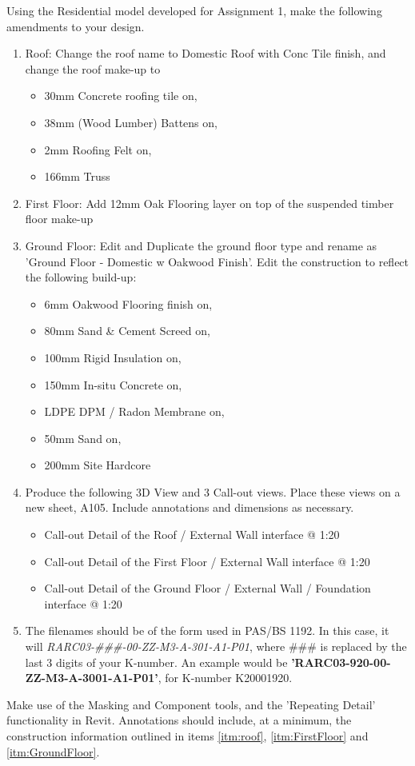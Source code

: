 Using the Residential model developed for Assignment 1, make the following amendments to your design.
\begin{enumerate}
	\item\label{itm:roof} Roof: Change the roof name to Domestic Roof with Conc Tile finish, and change the roof make-up to 
	\begin{itemize}
		\item 30mm Concrete roofing tile on,
		\item 38mm (Wood Lumber) Battens on,
		\item 2mm Roofing Felt on,
		\item 166mm Truss
	\end{itemize}
	\item\label{itm:FirstFloor} First Floor: Add 12mm Oak Flooring layer on top of the suspended timber floor make-up
	\item\label{itm:GroundFloor} Ground Floor: Edit and Duplicate the ground floor type and rename as 'Ground Floor - Domestic w Oakwood Finish'.  Edit the construction to reflect the following build-up:
	\begin{itemize}
		\item 6mm Oakwood Flooring finish on,
		\item 80mm Sand \& Cement Screed on,
		\item 100mm Rigid Insulation on,
		\item 150mm In-situ Concrete on,
		\item LDPE DPM / Radon Membrane on,
		\item 50mm Sand on,
		\item 200mm Site Hardcore
	\end{itemize}
	\item Produce the following 3D View and 3 Call-out views. Place these views on a new sheet, A105.  Include annotations and dimensions as necessary.
	\begin{itemize}
		\item Call-out Detail of the Roof / External Wall interface @ 1:20
		\item Call-out Detail of the First Floor / External Wall interface @ 1:20
		\item Call-out Detail of the Ground Floor / External Wall / Foundation interface @ 1:20
	\end{itemize}
	\item The filenames should be of the form used in PAS/BS 1192.  In this case, it will \textit{RARC03-\#\#\#-00-ZZ-M3-A-301-A1-P01}, where \#\#\# is replaced by the last 3 digits of your K-number. An example would be \textbf{'RARC03-920-00-ZZ-M3-A-3001-A1-P01'}, for K-number K20001920.
\end{enumerate}
Make use of the Masking and Component tools, and the 'Repeating Detail' functionality in Revit.  Annotations should include, at a minimum, the construction information outlined in items \ref{itm:roof}, \ref{itm:FirstFloor} and \ref{itm:GroundFloor}. 






